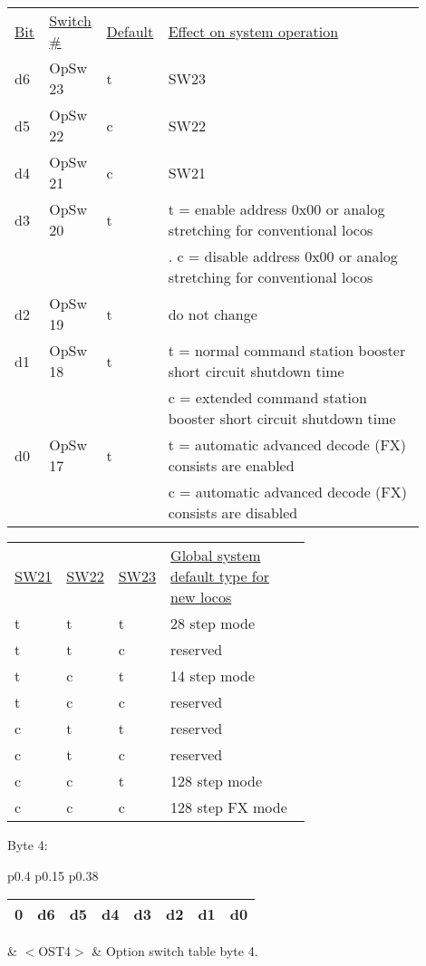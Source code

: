 \begin{tabular}{p{0.05\linewidth} p{0.125\linewidth} p{0.1\linewidth} p{0.625\linewidth}} 
\underline{Bit} & \underline{Switch \#} & \underline{Default} & \underline{Effect on system operation}\\
d6 & OpSw 23 & t & SW23\\
d5 & OpSw 22 & c & SW22\\ 
d4 & OpSw 21 & c & SW21\\
d3 & OpSw 20 & t & t = enable address 0x00 or analog stretching for conventional locos\\
&&&. c = disable address 0x00 or analog stretching for conventional locos\\
d2 & OpSw 19 & t & do not change\\
d1 & OpSw 18 & t & t = normal command station booster short circuit shutdown time\\
&&& c = extended command station booster short circuit shutdown time\\
d0 & OpSw 17 & t & t = automatic advanced decode (FX) consists are enabled\\
&&& c = automatic advanced decode (FX) consists are disabled\\
\end{tabular}

\begin{tabular}{p{0.05\linewidth} p{0.05\linewidth} p{0.05\linewidth} p{0.5\linewidth}} 
\underline{SW21} & \underline{SW22} & \underline{SW23} & \underline{Global system default type for new locos}\\
t & t & t & 28 step mode\\
t & t & c & reserved\\
t & c & t & 14 step mode\\
t & c & c & reserved\\
c & t & t & reserved\\
c & t & c & reserved\\
c & c & t & 128 step mode\\
c & c & c & 128 step FX mode\\
\end{tabular}

Byte 4:

\begin{tabular}{p{0.4\linewidth} p{0.15\linewidth} p{0.38\linewidth}} 

\begin{tabular}{|p{0.3cm}|p{0.3cm}|p{0.3cm}|p{0.3cm}|p{0.3cm}|p{0.3cm}|p{0.3cm}|p{0.3cm}|}
\hline
0 & d6 & d5 & d4 & d3 & d2 & d1 & d0\\
\hline
\end{tabular}
& $<$OST4$>$ & Option switch table byte 4.\\
\end{tabular}

